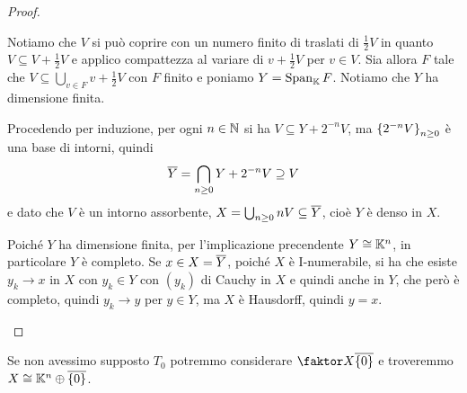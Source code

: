 \begin{proof}
\begin{itemize}
Notiamo che $V$ si pu\`o coprire con un numero finito di traslati di $\frac12 V$ in quanto $V\subseteq V+\frac12V$ e applico compattezza al variare di $v+\frac12V$ per $v\in V$. Sia allora $F$ tale che $V\subseteq\bigcup_{v\in F}v+\frac12V$ con $F$ finito e poniamo $Y=\operatorname{Span}_{\mathbb{K}} F$. Notiamo che $Y$ ha dimensione finita.

Procedendo per induzione, per ogni $n\in\mathbb{N}$ si ha $V\subseteq Y+2^{-n}V$, ma $\left\{{2^{-n}V}\right\}_{n\geq0}$ \`e una base di intorni, quindi 
\[\overline{Y}=\bigcap_{n\geq 0}Y+2^{-n}V\supseteq V\]
e dato che $V$ \`e un intorno assorbente, $X=\bigcup_{n\geq 0}nV\subseteq \overline{Y}$, cio\`e $Y$ \`e denso in $X$.

Poich\'e $Y$ ha dimensione finita, per l'implicazione precendente $Y\cong \mathbb{K}^n$, in particolare $Y$ \`e completo. Se $x\in X=\overline{Y}$, poich\'e $X$ \`e I-numerabile, si ha che esiste $y_k\to x$ in $X$ con $y_k\in Y$ con $(y_k)$ di Cauchy in $X$ e quindi anche in $Y$, che per\`o \`e completo, quindi $y_k\to y$ per $y\in Y$, ma $X$ \`e Hausdorff, quindi $y=x$.
\end{itemize}
\setlength{\leftmargini}{0.5cm}
\end{proof}

\begin{remark}
Se non avessimo supposto $T_0$ potremmo considerare $\quot X{\ol{\cpa0}}$ e troveremmo $X\cong \mathbb{K}^n\oplus \overline{\left\{{0}\right\}}$.
\end{remark}
